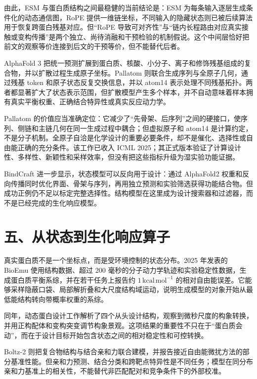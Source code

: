 \documentclass[10pt]{article}
\begin{document}
由此，ESM 与蛋白质结构之间最稳健的当前结论是：ESM 为每条输入逐层生成条件化的动态通信图，RoPE 提供一维链坐标，不同输入的隐藏状态则已被后续算法用于恢复跨蛋白残基对应。但“RoPE 导致可对齐性”与“链内长程路由对应真实接触或变构传播”是两个独立、尚待消融和干预检验的机制假说。这个中间层恰好把前文的观察等价连接到后文的干预等价，但不能替代后者。

AlphaFold 3 把统一预测扩展到蛋白质、核酸、小分子、离子和修饰残基组成的复合物，并以扩散过程生成原子坐标\cite{abramson2024}。Pallatom 则联合生成序列与全原子几何，通过残基 token 和原子状态反复交换信息，并以 atom14 表示处理不同残基拓扑\cite{qu2024}。两者都显著扩大了状态表示范围，但扩散模型产生多个样本，并不自动意味着样本拥有真实平衡权重、正确结合特异性或真实反应动力学。

Pallatom 的价值应当准确定位：它减少了“先骨架、后序列”之间的硬接口，使序列、侧链和主链几何在同一生成过程中耦合；但虚拟原子和 atom14 是计算约定，不是分子机制。全原子自洽是化学设计的重要必要条件，却不是催化、选择性或自由能正确的充分条件。该工作已收入 ICML 2025；其正式版本验证了计算设计性、多样性、新颖性和采样效率，但没有把这些指标升级为湿实验功能证据。

BindCraft 进一步显示，状态模型可以反向用于设计：通过 AlphaFold2 权重和反向传播同时优化界面、骨架与序列，再用独立预测和实验筛选获得功能结合物\cite{pacesa2025}。但成功正例仍不足以标定完整选择性。结构模型在这里成为设计搜索器和过滤器，而不是已经完成的生化响应模型。

\section*{五、从状态到生化响应算子}

真实蛋白质不是一个坐标点，而是受环境控制的状态分布。2025 年发表的 BioEmu 使用结构数据、超过 200 毫秒的分子动力学轨迹和实验稳定性数据，生成蛋白质平衡系综，并在若干任务上报告约 $1\,\mathrm{kcal\,mol^{-1}}$ 的相对自由能误差\cite{lewis2025}。它能够采样隐蔽口袋、局部解折叠和大尺度结构域运动，说明生成模型的对象开始从最低能结构转向带概率权重的系综。

同年，动态蛋白设计工作解析了四个从头设计结构，观察到微秒尺度的构象转换，并用正构配体和\mbox{变构突变}调节构象景观\cite{guo2025}。这项结果的重要性不只在于“蛋白质会动”，而在于设计目标开始包含状态之间的相对稳定性和可控转换。

Boltz-2 则把复合物结构与结合亲和力联合建模，并报告接近自由能微扰方法的部分基准性能\cite{passaro2025}。但亲和力预测、结合分类和跨靶点特异性是不同任务；模型在同分布亲和力基准上的相关性，不能替代非匹配配对和竞争条件下的外部校准。
\end{document}
